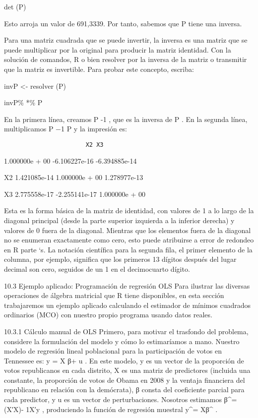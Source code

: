 \documentclass[
]{book}
\begin{document}
det (P)

Esto arroja un valor de 691,3339. Por tanto, sabemos que P tiene una inversa.

Para una matriz cuadrada que se puede invertir, la inversa es una matriz que se puede multiplicar por la original para producir la matriz identidad. Con la solución de comandos, R o bien resolver por la inversa de la matriz o transmitir que la matriz es invertible. Para probar este concepto, escriba:

invP \textless- resolver (P)

invP\% *\% P

En la primera línea, creamos P -1 , que es la inversa de P . En la segunda línea, multiplicamos P −1 P y la impresión es:

\begin{verbatim}
                       X2 X3
\end{verbatim}

1.000000e + 00 -6.106227e-16 -6.394885e-14

X2 1.421085e-14 1.000000e + 00 1.278977e-13

X3 2.775558e-17 -2.255141e-17 1.000000e + 00

Esta es la forma básica de la matriz de identidad, con valores de 1 a lo largo de la diagonal principal (desde la parte superior izquierda a la inferior derecha) y valores de 0 fuera de la diagonal. Mientras que los elementos fuera de la diagonal no se enumeran exactamente como cero, esto puede atribuirse a error de redondeo en R parte `s. La notación científica para la segunda fila, el primer elemento de la columna, por ejemplo, significa que los primeros 13 dígitos después del lugar decimal son cero, seguidos de un 1 en el decimocuarto dígito.

10.3 Ejemplo aplicado: Programación de regresión OLS
Para ilustrar las diversas operaciones de álgebra matricial que R tiene disponibles, en esta sección trabajaremos un ejemplo aplicado calculando el estimador de mínimos cuadrados ordinarios (MCO) con nuestro propio programa usando datos reales.

10.3.1 Cálculo manual de OLS
Primero, para motivar el trasfondo del problema, considere la formulación del modelo y cómo lo estimaríamos a mano. Nuestro modelo de regresión lineal poblacional para la participación de votos en Tennessee es: y = X β+ u . En este modelo, y es un vector de la proporción de votos republicanos en cada distrito, X es una matriz de predictores (incluida una constante, la proporción de votos de Obama en 2008 y la ventaja financiera del republicano en relación con la demócrata), β consta del coeficiente parcial para cada predictor, y u es un vector de perturbaciones. Nosotros estimamos β\^{}= (X′X)- 1X′y , produciendo la función de regresión muestral y\^{}= Xβ\^{} .
\end{document}
